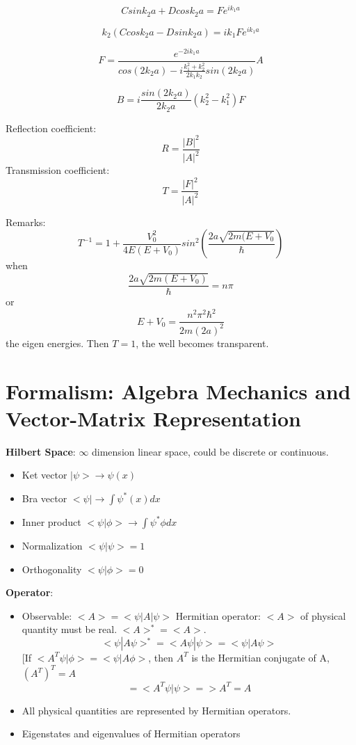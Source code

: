 \documentclass[12pt,a4paper]{article}
\begin{document}
\[
Csin k_2 a + Dcos k_2 a= Fe^{i k_1 a}
\]

\[
k_2 (C cos k_2 a - D sin k_2 a)=i k_1 F e^{i k_1 a}
\]

\[
F= \frac{e^{-2i k_1 a}}{cos(2 k_2 a) -i\frac{k_1 ^2 + k_2 ^2}{2 k_1 k_2}sin(2 k_2 a)} A
\]

\[
B= i \frac{sin(2 k_2 a)}{2 k_2 a} (k_2 ^2 - k_1 ^2)F
\]

Reflection coefficient:
\[
R=\frac{|B|^2}{|A|^2}
\]
Transmission coefficient:
\[
T=\frac{|F|^2}{|A|^2}
\]

Remarks:
\[
T^{-1}= 1+ \frac{V_0 ^2}{4E(E+ V_0 )} sin^2 (\frac{2a\sqrt{2m(E+V_0}}{\hbar})
\]
when
\[
\frac{2a\sqrt{2m(E+ V_0)}}{\hbar} =n\pi
\]
or
\[
E+V_0=\frac{n^2 \pi ^2 \hbar ^2}{2m(2a)^2}
\]
the eigen energies. Then $T=1$, the well becomes transparent.

\pagebreak

\section{Formalism: Algebra Mechanics and Vector-Matrix Representation}

\textbf{Hilbert Space}: $\infty$ dimension linear space, could be discrete or continuous.\\

\begin{itemize}

\item Ket vector $| \psi > \to \psi (x)$
\item Bra vector $< \psi | \to \int \psi^{*} (x)dx$
\item Inner product $ < \psi | \phi > \to \int \psi ^* \phi dx$
\item Normalization $< \psi | \psi >=1$
\item Orthogonality $< \psi | \phi>=0$

\end{itemize}

\textbf{Operator}:
\begin{itemize}

\item Observable: $<A>=<\psi |A| \psi >$
Hermitian operator: $<A>$ of physical quantity must be real. $<A>^*=<A>$.
\[
< \psi |A \psi>^{*}=<A \psi | \psi >= < \psi | A \psi >
\]
[If $<A^{T} \psi | \phi > = < \psi | A \phi >$, then $A^{T}$ is the Hermitian conjugate of A, $(A^{T})^{T} = A$
\[
= <A^{T} \psi | \psi > => A^{T} = A
\]

\item All physical quantities are represented by Hermitian operators.

\item Eigenstates and eigenvalues of Hermitian operators

\end{itemize}
\end{document}
